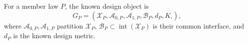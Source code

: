 For a member law \(P\), the known design object is
\[
 G_P=(\mathcal X_P,\mathcal A_{0,P},\mathcal A_{1,P},\mathcal B_P,d_P,K_\square),
\]
where \(\mathcal A_{0,P},\mathcal A_{1,P}\) partition \(\mathcal X_P\), \(\mathcal B_P\subset\operatorname{int}(\mathcal X_P)\) is their common interface, and \(d_P\) is the known design metric.